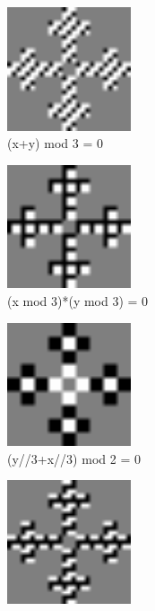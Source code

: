 \begin{figure}[H]
\begin{subfigure}{0.4\textwidth}
    \includegraphics[width=0.4\textwidth]{images/lycacode_mask_2}
    \caption{(x+y) mod 3 = 0}
    \label{fig:lycacode_mask_2}
  \end{subfigure}
  \begin{subfigure}{0.4\textwidth}
    \centering
    \includegraphics[width=0.4\textwidth]{images/lycacode_mask_3}
    \caption{(x mod 3)*(y mod 3) = 0}
    \label{fig:lycacode_mask_3}
  \end{subfigure}
  \begin{subfigure}{0.4\textwidth}
    \centering
    \includegraphics[width=0.4\textwidth]{images/lycacode_mask_4}
    \caption{(y//3+x//3) mod 2 = 0}
    \label{fig:lycacode_mask_4}
  \end{subfigure}
  \begin{subfigure}{0.4\textwidth}
    \centering
    \includegraphics[width=0.4\textwidth]{images/lycacode_mask_5}

\end{subfigure}
\end{figure}

